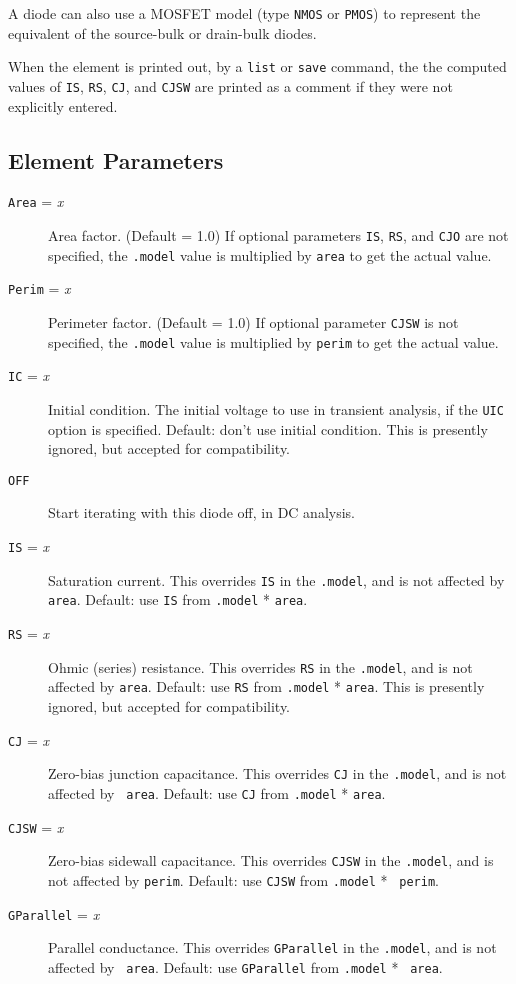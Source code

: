 A diode can also use a MOSFET model (type {\tt NMOS} or {\tt PMOS}) to
represent the equivalent of the source-bulk or drain-bulk diodes.

When the element is printed out, by a {\tt list} or {\tt save}
command, the the computed values of {\tt IS}, {\tt RS}, {\tt CJ}, and
{\tt CJSW} are printed as a comment if they were not explicitly
entered.
\subsection{Element Parameters}

\begin{description}
  
\item[{\tt Area} = {\it x}] Area factor.  (Default = 1.0) If optional
  parameters {\tt IS}, {\tt RS}, and {\tt CJO} are not specified, the
  {\tt .model} value is multiplied by {\tt area} to get the actual
  value.
  
\item[{\tt Perim} = {\it x}] Perimeter factor.  (Default = 1.0) If
  optional parameter {\tt CJSW} is not specified, the {\tt .model}
  value is multiplied by {\tt perim} to get the actual value.
  
\item[{\tt IC} = {\it x}] Initial condition.  The initial voltage to
  use in transient analysis, if the {\tt UIC} option is specified.
  Default: don't use initial condition.  This is presently ignored,
  but accepted for compatibility.
  
\item[{\tt OFF}] Start iterating with this diode off, in DC analysis.
  
\item[{\tt IS} = {\it x}] Saturation current.  This overrides {\tt IS}
  in the {\tt .model}, and is not affected by {\tt area}.  Default:
  use {\tt IS} from {\tt .model} * {\tt area}.
  
\item[{\tt RS} = {\it x}] Ohmic (series) resistance.  This overrides
  {\tt RS} in the {\tt .model}, and is not affected by {\tt area}.
  Default: use {\tt RS} from {\tt .model} * {\tt area}.  This is
  presently ignored, but accepted for compatibility.
  
\item[{\tt CJ} = {\it x}] Zero-bias junction capacitance.  This
  overrides {\tt CJ} in the {\tt .model}, and is not affected by {\tt
    area}.  Default: use {\tt CJ} from {\tt .model} * {\tt area}.
  
\item[{\tt CJSW} = {\it x}] Zero-bias sidewall capacitance.  This
  overrides {\tt CJSW} in the {\tt .model}, and is not affected by
  {\tt perim}.  Default: use {\tt CJSW} from {\tt .model} * {\tt
    perim}.
  
\item[{\tt GParallel} = {\it x}] Parallel conductance.  This overrides
  {\tt GParallel} in the {\tt .model}, and is not affected by {\tt
    area}.  Default: use {\tt GParallel} from {\tt .model} * {\tt
    area}.

\end{description}
